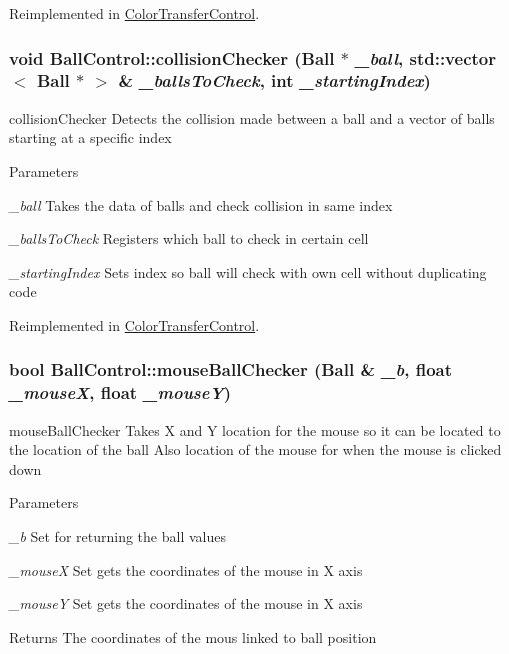 Reimplemented in \hyperlink{classColorTransferControl_a9567be01e35663e82691d1756028899a}{ColorTransferControl}.\hypertarget{classBallControl_af84eaea1411dd325db8e94c7adc5d9a3}{
\subsubsection[{collisionChecker}]{\setlength{\rightskip}{0pt plus 5cm}void BallControl::collisionChecker ({\bf Ball} $\ast$ {\em \_\-ball}, \/  std::vector$<$ {\bf Ball} $\ast$ $>$ \& {\em \_\-ballsToCheck}, \/  int {\em \_\-startingIndex})}}
\label{classBallControl_af84eaea1411dd325db8e94c7adc5d9a3}


collisionChecker Detects the collision made between a ball and a vector of balls starting at a specific index 
\begin{DoxyParams}{Parameters}
\item[{\em \_\-ball}]Takes the data of balls and check collision in same index \item[{\em \_\-ballsToCheck}]Registers which ball to check in certain cell \item[{\em \_\-startingIndex}]Sets index so ball will check with own cell without duplicating code \end{DoxyParams}


Reimplemented in \hyperlink{classColorTransferControl_a082bba0dbe1e10809d9fb8dc2386a1da}{ColorTransferControl}.\hypertarget{classBallControl_a85fce07250ce552fd098b6c74d34c588}{
\subsubsection[{mouseBallChecker}]{\setlength{\rightskip}{0pt plus 5cm}bool BallControl::mouseBallChecker ({\bf Ball} \& {\em \_\-b}, \/  float {\em \_\-mouseX}, \/  float {\em \_\-mouseY})}}
\label{classBallControl_a85fce07250ce552fd098b6c74d34c588}


mouseBallChecker Takes X and Y location for the mouse so it can be located to the location of the ball Also location of the mouse for when the mouse is clicked down 
\begin{DoxyParams}{Parameters}
\item[{\em \_\-b}]Set for returning the ball values \item[{\em \_\-mouseX}]Set gets the coordinates of the mouse in X axis \item[{\em \_\-mouseY}]Set gets the coordinates of the mouse in X axis \end{DoxyParams}
\begin{DoxyReturn}{Returns}
The coordinates of the mous linked to ball position 
\end{DoxyReturn}


